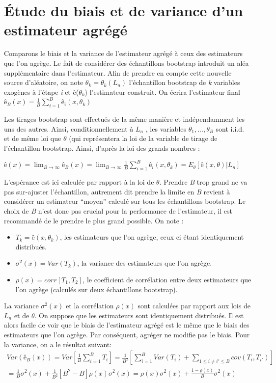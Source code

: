 	\section{Étude du biais et de variance d'un estimateur agrégé \cite{ESL}}
	\begin{small}
	Comparons le biais et la variance de l’estimateur agrégé à ceux des estimateurs que l’on agrège.
	Le fait de considérer des échantillons bootstrap introduit un aléa supplémentaire dans l’estimateur. Afin de prendre en compte cette nouvelle source d’aléatoire, on note $\theta_k = \theta_k(L_n)$ l’échantillon bootstrap de \textit{k} variables exogènes à l’étape \textit{i} et ê($\theta_k$) l’estimateur construit. On écrira l'estimateur final ${ê_B(x) =  \frac{1}{B} \sum_{i=1}^{B} ê_i(x,\theta_k)}$
	\par
	Les tirages bootstrap sont effectués de la même manière et indépendamment les uns des autres.
	Ainsi, conditionnellement à $L_n$ , les variables $\theta_1,..., \theta_B$ sont i.i.d. et de même loi que $\theta$ (qui représentera la loi de la variable de tirage de l’échantillon bootstrap. Ainsi, d’après la loi des grands nombres :
	\begin{center}
		${ê(x) = \lim_{B \to \infty} ê_B(x) = \lim_{B \to \infty} \frac{1}{B} \sum_{i=1}^{B} ê_i(x,\theta_k) = E_\theta[ê(x,\theta) | L_n]  }$
	\end{center}
	L’espérance est ici calculée par rapport à la loi de $\theta$. Prendre \textit{B} trop grand ne va pas sur-ajuster l’échantillon, autrement dit prendre la limite en \textit{B} revient à considérer un estimateur “moyen” calculé sur tous les échantillons bootstrap. Le choix de \textit{B} n’est donc pas crucial pour la performance de l’estimateur, il est recommandé de le prendre le plus grand possible. On note :
	\begin{itemize}
	\item ${T_k=ê(x,\theta_k)}$, les estimateurs que l'on agrège, ceux ci étant identiquement distribués.
	\item ${\sigma^2(x) = Var (T_k)}$, la variance des estimateurs que l'on agrège.
	\item ${\rho(x) = corr[T_1,T_2]}$, le coefficient de corrélation entre deux estimateurs que l’on agrège (calculés sur deux échantillons bootstrap).
	\end{itemize}
	La variance ${\sigma^2(x)}$ et la corrélation ${\rho(x)}$ sont calculées par rapport aux lois de \textit{$L_n$} et de $\theta$. On suppose que les estimateurs sont identiquement distribués. Il est alors facile de voir que le biais
	de l’estimateur agrégé est le même que le biais des estimateurs que l’on agrège. Par conséquent,
	agréger ne modifie pas le biais. Pour la variance, on a le résultat suivant:
	\begin{equation*}
	\begin{split}	
	Var(ê_B(x)) = Var [ \frac{1}{B} \sum_{i=1}^{B} T_i] = \frac{1}{B^2} [\sum_{i=1}^{B} Var(T_i) + \sum_{1 \leq i \neq i' \leq B} cov(T_i,T_{i'}) ] \\ = \frac{1}{B}\sigma^2(x) + \frac{1}{B^2}[B^2-B]\rho(x)\sigma^2(x) = \rho(x)\sigma^2(x) + \frac{1-\rho(x)}{B}\sigma^2(x)
	\end{split}
	\end{equation*}


\end{small}
